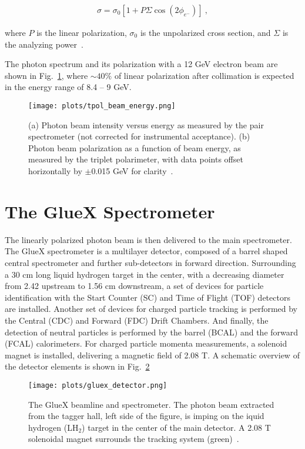 {\begin{equation}
    \label{eq.2.1.3}
    \begin{aligned}
        \sigma = \sigma_0[1+P\Sigma \cos (2\phi_{e^-})]~,
    \end{aligned}
\end{equation}

\noindent where $P$ is the linear polarization, $\sigma_0$ is the unpolarized cross section, and $\Sigma$ is the analyzing power~\cite{Dugger17}.
~\par The photon spectrum and its polarization with a 12 GeV electron beam are shown in Fig.~\ref{fig.2.1.3}, where $\sim 40\%$ of linear polarization after collimation is expected in the energy range of 8.4 – 9 GeV.

\begin{figure}[H]
    \centering
        \texttt{[image: plots/tpol\_beam\_energy.png]}
        \caption{(a) Photon beam intensity versus energy as measured by the pair spectrometer (not corrected for instrumental acceptance). (b) Photon beam polarization as a function of beam energy, as measured by the triplet polarimeter, with data points offset horizontally by $\pm$0.015 GeV for clarity~\cite{GlueX97}.}
        \label{fig.2.1.3}
\end{figure}


\section{The GlueX Spectrometer}
\label{p.2.2}

The linearly polarized photon beam is then delivered to the main spectrometer. The GlueX spectrometer is a multilayer detector, composed of a barrel shaped central spectrometer and further sub-detectors in forward direction. Surrounding a 30 cm long liquid hydrogen target in the center, with a decreasing diameter from 2.42 upstream to 1.56 cm downstream, a set of devices for particle identification with the Start Counter (SC) and Time of Flight (TOF) detectors are installed. Another set of devices for charged particle tracking is performed by the Central (CDC) and Forward (FDC) Drift Chambers. And finally, the detection of neutral particles is performed by the barrel (BCAL) and the forward (FCAL) calorimeters. For charged particle momenta measurements, a solenoid magnet is installed, delivering a magnetic field of 2.08 T. A schematic overview of the detector elements is shown in Fig.~\ref{fig.2.2.1}

\begin{figure}[H]
    \centering
        \texttt{[image: plots/gluex\_detector.png]}
        \caption{The GlueX beamline and spectrometer. The photon beam extracted from the tagger hall, left side of the figure, is imping on the iquid hydrogen (LH$_2$) target in the center of the main detector. A 2.08 T solenoidal magnet surrounds the tracking system (green)~\cite{GlueX97}.}
        \label{fig.2.2.1}
\end{figure}

}
